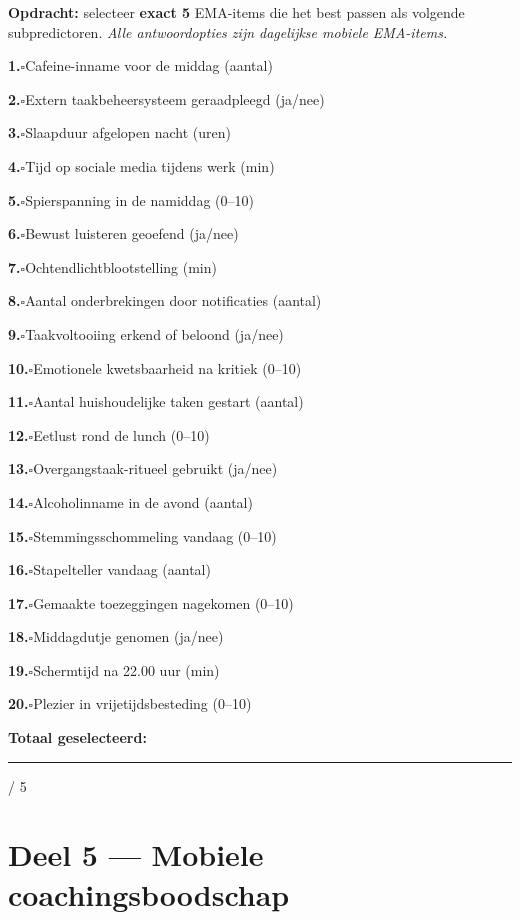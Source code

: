 \documentclass[11pt,a4paper]{article}
\newcommand{\checkitemBFS}[2]{%
\noindent\small\textbf{#1.}\hspace{0.45em}$\square$\hspace{0.4em}#2\par\vspace{0.20em}}
\begin{document}
\begin{responsebox}
\small\textbf{Opdracht:} selecteer \textbf{exact 5} EMA-items die het best passen als volgende subpredictoren.
\textit{Alle antwoordopties zijn dagelijkse mobiele EMA-items.}

\checkitemBFS{1}{Cafeine-inname voor de middag (aantal)}
\checkitemBFS{2}{Extern taakbeheersysteem geraadpleegd (ja/nee)}
\checkitemBFS{3}{Slaapduur afgelopen nacht (uren)}
\checkitemBFS{4}{Tijd op sociale media tijdens werk (min)}
\checkitemBFS{5}{Spierspanning in de namiddag (0--10)}
\checkitemBFS{6}{Bewust luisteren geoefend (ja/nee)}
\checkitemBFS{7}{Ochtendlichtblootstelling (min)}
\checkitemBFS{8}{Aantal onderbrekingen door notificaties (aantal)}
\checkitemBFS{9}{Taakvoltooiing erkend of beloond (ja/nee)}
\checkitemBFS{10}{Emotionele kwetsbaarheid na kritiek (0--10)}
\checkitemBFS{11}{Aantal huishoudelijke taken gestart (aantal)}
\checkitemBFS{12}{Eetlust rond de lunch (0--10)}
\checkitemBFS{13}{Overgangstaak-ritueel gebruikt (ja/nee)}
\checkitemBFS{14}{Alcoholinname in de avond (aantal)}
\checkitemBFS{15}{Stemmingsschommeling vandaag (0--10)}
\checkitemBFS{16}{Stapelteller vandaag (aantal)}
\checkitemBFS{17}{Gemaakte toezeggingen nagekomen (0--10)}
\checkitemBFS{18}{Middagdutje genomen (ja/nee)}
\checkitemBFS{19}{Schermtijd na 22.00 uur (min)}
\checkitemBFS{20}{Plezier in vrijetijdsbesteding (0--10)}
\vspace{0.4em}
\noindent\textbf{Totaal geselecteerd:}\hspace{0.5em}\rule{1.2cm}{0.25pt}\hspace{0.2em}/ 5
\end{responsebox}

\vspace{0.6em}
\newpage


\section{Deel 5 --- Mobiele coachingsboodschap}
\end{document}
